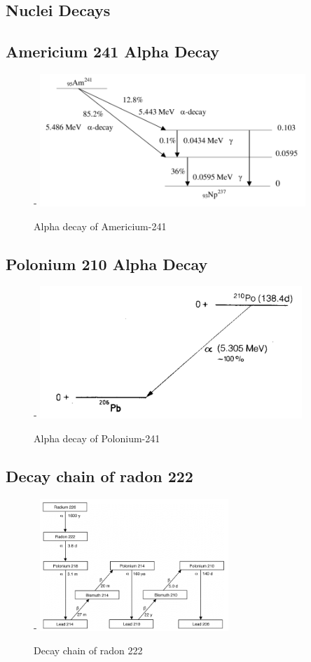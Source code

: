 \documentclass[a4paper]{article}
\begin{document}
\newpage
\begin{appendix}
  \listoffigures
  \listoftables
  \section{Nuclei Decays}
    \subsection{Americium 241 Alpha Decay} \label{ap:a1}
        \begin{figure}[H]-
        \centering
        \includegraphics[height=5cm]{plots/Am241.png}
        \caption{Alpha decay of Americium-241 \cite{Malain_2019}}
        \end{figure}
    \subsection{Polonium 210 Alpha Decay} \label{ap:a1}
        \begin{figure}[H]-
        \centering
        \includegraphics[height=5cm]{plots/po210.png}
        \caption{Alpha decay of Polonium-241 \cite{lieser_2001}}
        \end{figure}
    \subsection{Decay chain of radon 222} \label{ap:a2}
        \begin{figure}[H]-
        \centering
        \includegraphics[height=5cm]{plots/radon222.png}
        \caption{Decay chain of radon 222 \cite{nhess-10-2051-2010}}
        \end{figure}

\end{appendix}
\end{document}
